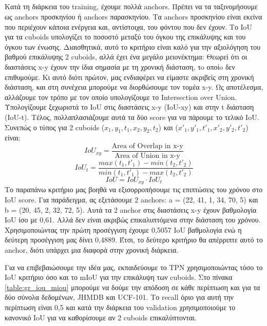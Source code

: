 \subsection{ }
Κατά τη διάρκεια του \en training\gr, έχουμε πολλά \en anchors\gr. Πρέπει να τα ταξινομήσουμε ως \en anchors  \gr προσκηνίου ή
\en anchors \gr παρασκηνίου. Τα \en anchors \gr προσκηνίου είναι εκείνα που περιέχουν κάποια ενέργεια και, αντίστοιχα, του φόντου
που δεν έχουν. Tο \en IoU \gr για τα \en cuboids \gr υπολογίζει το ποσοστό μεταξύ του όγκου της επικάλυψης
και του όγκου των ένωσης.
Διαισθητικά, αυτό το κριτήριο είναι καλό για την αξιολόγηση του βαθμού επικάλυψης 2 \en cuboids\gr, αλλά έχει ένα μεγάλο μειονέκτημα:
Θεωρεί ότι οι διαστάσεις \en x-y \gr έχουν την ίδια σημασία με τη χρονική διάσταση, τo οποίo δεν επιθυμούμε. Κι αυτό  διότι
πρώτον, μας ενδιαφέρει να είμαστε ακριβείς στη χρονική διάσταση, και στη συνέχεια μπορούμε να διορθώσουμε τον τομέα \en x-y\gr.
Ως αποτέλεσμα, αλλάζουμε τον τρόπο με τον οποίο υπολογίζουμε το \en Intersection over Union\gr. Υπολογίζουμε ξεχωριστά
το \en IoU \gr στις διαστάσεις \en x-y (IoU-xy) \gr και στην \en t \gr  διάσταση \en (IoU-t)\gr. Τέλος,  πολλαπλασιάζουμε αυτά τα δύο \en score
 \gr για να πάρουμε το τελικό \en IoU\gr.
Συνεπώς ο τύπος για 2 \en cuboids ($x_1, y_1, t_1, x_2, y_2, t_2$) \gr  και \en  ($x'_1, y'_1, t'_1, x'_2, y'_2, t'_2$) \gr είναι:\en
\[ IoU_{xy} = \frac{ \text{Area of Overlap in x-y}} { \text{Area of Union in x-y}}  \]
\[ IoU_t = \frac { max(t_1, t'_1) - min(t_2, t'_2)} {min(t_1,t'_1) - max(t_2,t'_2)} \]
\[ IoU = IoU_{xy} \cdot  IoU_t \]
\gr Το παραπάνω κριτήριο μας βοηθά να εξισορροπήσουμε τις επιπτώσεις του χρόνου στο \en IoU score\gr. Για παράδειγμα, ας εξετάσουμε 2 \en anchors\gr:
\en a = (22, 41, 1, 34, 70, 5) \gr και \en  b = (20, 45, 2, 32, 72, 5)\gr. Αυτά τα 2 \en anchor \gr στις διαστάσεις \en  x-y \gr έχουν βαθμολογία \en IoU \gr ίσο με 0,61.
Αλλά δεν είναι ακριβώς επικαλυπτόμενα στην διάσταση του χρόνου. Χρησιμοποιώντας την πρώτη προσέγγιση έχουμε 0,5057 \en IoU \gr βαθμολογία ενώ η
δεύτερη προσέγγιση μας δίνει 0,4889. Έτσι, το δεύτερο κριτήριο θα απέρριπτε αυτό το \en  anchor\gr, διότι υπάρχει μια διαφορά στην χρονική διάρκεια. \par


Για να επιβεβαιώσουμε την ιδέα μας, εκπαιδεύουμε το \en TPN \gr χρησιμοποιώντας τόσο το \en IoU \gr κριτήριο όσο και το \en mIoU \gr  για την επικάλυψη των \en cuboids\gr.
Στο πίνακα \ref{table:gr_iou_miou} μπορούμε να δούμε την απόδοση σε κάθε περίπτωση και για τα δύο σύνολα δεδομένων, \en JHMDB \gr και \en UCF-101\gr. Το \en recall \gr όριο για αυτή
την περίπτωση είναι 0,5 και κατά την διάρκεια του \en validation \gr χρησιμοποιούμε το κανονικό \en IoU \gr για να καθορίσουμε αν 2 \en cuboids \gr επικαλύπτονται.

